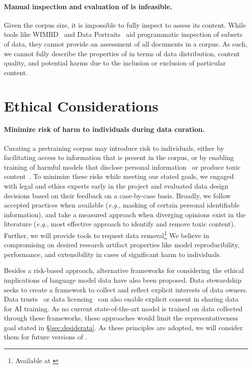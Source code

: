 \paragraph{Manual inspection and evaluation of \dolma is infeasible.}
Given the corpus size, it is impossible to fully inspect \dolma to assess its content. 
While tools like WIMBD~\citep{wimbd} and Data Portraits~\citep{Marone2023DataPR} aid programmatic inspection of subsets of data, they cannot provide an assessment of all documents in a corpus. 
As such, we cannot fully describe the properties of \dolma in terms of data distribution, content quality, and potential harms due to the inclusion or exclusion of particular content.


\section*{Ethical Considerations}
\label{sec:ethics}




\paragraph{Minimize risk of harm to individuals during data curation.}

Curating a pretraining corpus may introduce risk to individuals, either by facilitating access to information that is present in the corpus, or by enabling training of harmful models
that disclose personal information~\citep{Carlini2020-jx} or produce toxic content~\citep{gehman-etal-2020-realtoxicityprompts,Ngo2021-fn}.
To minimize these risks while meeting our stated goals, we engaged with legal and ethics experts 
early in the project and evaluated data design decisions based on their feedback on a case-by-case basis.
Broadly, we follow accepted practices when available (\textit{e.g.}, masking of certain personal identifiable information), and take a measured approach when diverging opinions exist in the literature (\textit{e.g.}, most effective approach to identify and remove toxic content). 
Further, we will provide tools to request data removal\footnote{\label{foot:removal}Available at {\href{https://docs.google.com/forms/d/e/1FAIpQLSfL6KzFR7xNJj6MPyV1uikIpj-VmrftC9mjty2nXzSClU2rnw/viewform}{}}}
We believe in compromising on desired research artifact properties like model reproducibility, performance, and extensibility in cases of significant harm to individuals.

Besides a risk-based approach, alternative frameworks for considering the ethical implications of language model data have also been proposed.
Data stewardship~\citep{Jernite2022DataGI} seeks to create a framework to collect and reflect explicit interests of data owners. 
Data trusts~\citep{datatrust} or data licensing~\citep{licensing} can also enable explicit consent in sharing data for AI training. 
As no current state-of-the-art model is trained on data collected through these frameworks, these approaches would limit the representativeness goal stated in \S\ref{sec:desiderata}.
As these principles are adopted, we will consider them for future versions of \dolma.




